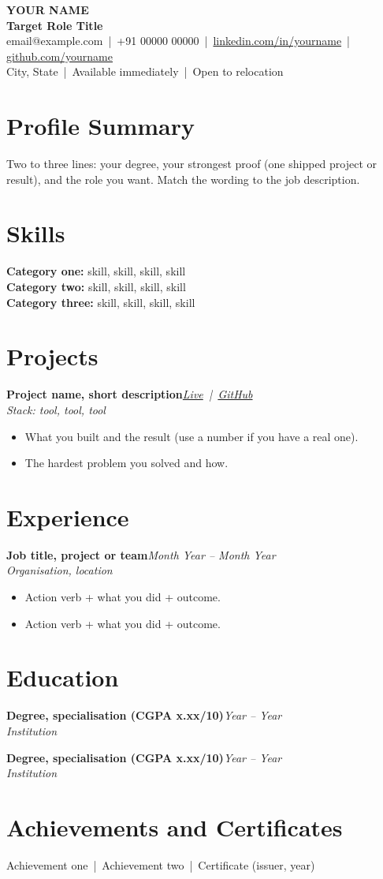 \documentclass[10pt,a4paper]{article}
\newcommand{\role}[3]{\textbf{#1}\hfill\textit{#2}\\[-1pt]\textit{\small #3}\par}
\begin{document}
\begin{center}
{\Huge\bfseries YOUR NAME}\\[3pt]
{\large\bfseries\color{accent} Target Role Title}\\[3pt]
\small email@example.com \,|\, +91 00000 00000 \,|\, \href{https://linkedin.com/in/yourname}{linkedin.com/in/yourname} \,|\, \href{https://github.com/yourname}{github.com/yourname}\\
City, State \,|\, Available immediately \,|\, Open to relocation
\end{center}

\section{Profile Summary}
Two to three lines: your degree, your strongest proof (one shipped project or result), and the role you want. Match the wording to the job description.

\section{Skills}
\textbf{Category one:} skill, skill, skill, skill\\
\textbf{Category two:} skill, skill, skill, skill\\
\textbf{Category three:} skill, skill, skill, skill

\section{Projects}
\role{Project name, short description}{\href{https://example.com}{Live} \,|\, \href{https://github.com/yourname/repo}{GitHub}}{Stack: tool, tool, tool}
\begin{itemize}
  \item What you built and the result (use a number if you have a real one).
  \item The hardest problem you solved and how.
\end{itemize}

\section{Experience}
\role{Job title, project or team}{Month Year -- Month Year}{Organisation, location}
\begin{itemize}
  \item Action verb + what you did + outcome.
  \item Action verb + what you did + outcome.
\end{itemize}

\section{Education}
\role{Degree, specialisation (CGPA x.xx/10)}{Year -- Year}{Institution}
\role{Degree, specialisation (CGPA x.xx/10)}{Year -- Year}{Institution}

\section{Achievements and Certificates}
Achievement one \,|\, Achievement two \,|\, Certificate (issuer, year)
\end{document}
